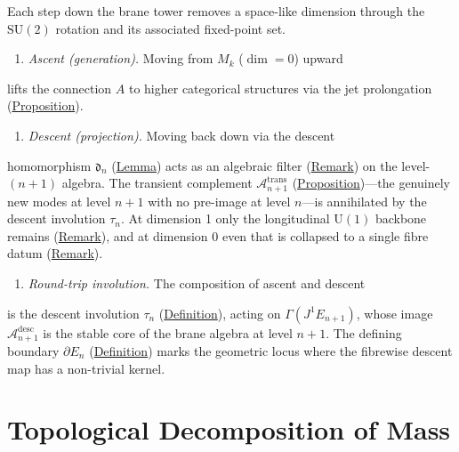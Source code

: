 \begin{remark}
  \label{rem:descent-fixed-point}
Each step down the brane tower removes a space-like dimension through the
$\mathrm{SU}(2)$ rotation and its associated fixed-point set.

\begin{enumerate}
  \item \emph{Ascent (generation).}  Moving from $M_k$ ($\dim = 0$) upward
\end{enumerate}
   lifts the connection $A$ to higher categorical structures via the jet
   prolongation (\hyperref[prop:jet-prolongation]{Proposition}).
\begin{enumerate}
  \item \emph{Descent (projection).}  Moving back down via the descent
\end{enumerate}
   homomorphism $\mathfrak{d}_n$ (\hyperref[lem:descent]{Lemma}) acts as an
   algebraic filter (\hyperref[rem:algebraic-filter]{Remark}) on the
   level-$(n{+}1)$ algebra.  The transient complement
   $\mathcal{A}_{n+1}^{\mathrm{trans}}$
   (\hyperref[prop:descent-eigenspaces]{Proposition})---the genuinely new
   modes at level $n{+}1$ with no pre-image at level $n$---is
   annihilated by the descent involution $\tau_n$.
   At dimension 1 only the longitudinal
   $\mathrm{U}(1)$ backbone remains
   (\hyperref[rem:descent-reduction]{Remark}), and at dimension 0 even
   that is collapsed to a single fibre datum
   (\hyperref[rem:descent-reduction-zero]{Remark}).
\begin{enumerate}
  \item \emph{Round-trip involution.}  The composition of ascent and descent
\end{enumerate}
   is the descent involution $\tau_n$
   (\hyperref[def:descent-involution]{Definition}), acting on
   $\Gamma(J^1 E_{n+1})$, whose image
   $\mathcal{A}_{n+1}^{\mathrm{desc}}$ is the stable core of the brane
   algebra at level $n{+}1$.  The defining boundary $\partial E_n$
   (\hyperref[def:brane-boundary]{Definition}) marks the geometric locus
   where the fibrewise descent map has a non-trivial kernel.
\end{remark}

\section{Topological Decomposition of Mass}
\label{sec:topological-mass}

